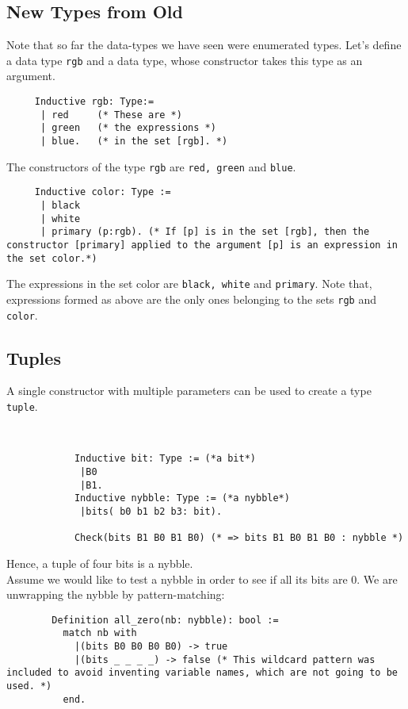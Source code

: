 \subsection{New Types from Old}
     
     
	 Note that so far the data-types we have seen were enumerated types.
	 Let's define a data type \lstinline!rgb! and a data type, whose constructor takes this type as an argument.
	\begin{lstlisting}
	 Inductive rgb: Type:=
	  | red     (* These are *)
	  | green   (* the expressions *)
	  | blue.   (* in the set [rgb]. *)
	 \end{lstlisting}
	 The constructors of the type \lstinline!rgb! are \lstinline!red, green! and \lstinline!blue!. 
	 
	 \begin{lstlisting}
	 Inductive color: Type := 
	  | black
	  | white
	  | primary (p:rgb). (* If [p] is in the set [rgb], then the constructor [primary] applied to the argument [p] is an expression in the set color.*) 
	 \end{lstlisting}	 
	 The expressions in the set color are \lstinline!black, white! and \lstinline!primary!.
	 Note that, expressions formed as above are the only ones belonging to the sets \lstinline!rgb! and \lstinline!color!.
	 

\subsection{Tuples}

    A single constructor with multiple parameters can be used to create a type \lstinline! tuple!.
	\begin{example}~\\\vspace{-10mm}
 	 	\begin{lstlisting}
 	 		Inductive bit: Type := (*a bit*) 
 	 		 |B0
 	 		 |B1.
 		    Inductive nybble: Type := (*a nybble*)
 		   	 |bits( b0 b1 b2 b3: bit).
 		   			 	
 		   	Check(bits B1 B0 B1 B0) (* => bits B1 B0 B1 B0 : nybble *)
 		\end{lstlisting}
 		Hence, a tuple of four bits is a nybble.\\ 		
 		Assume we would like to test a nybble in order to see if all its bits are 0. 
 		We are unwrapping the nybble by pattern-matching:
 		\begin{lstlisting}
 		Definition all_zero(nb: nybble): bool :=
 		  match nb with
 	  	    |(bits B0 B0 B0 B0) -> true
 		    |(bits _ _ _ _) -> false (* This wildcard pattern was included to avoid inventing variable names, which are not going to be used. *) 
 		  end.
 		 \end{lstlisting}
 	\end{example}
 	

